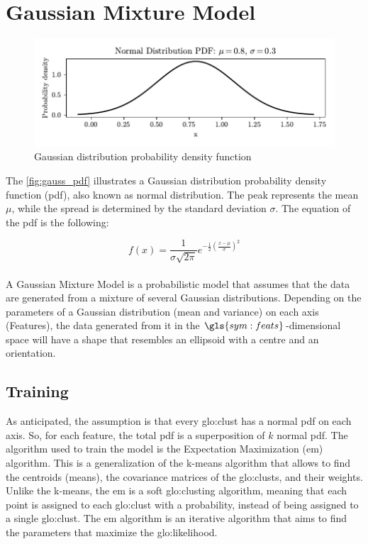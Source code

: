 \section{Gaussian Mixture Model}
\label{sec:gaussian}

\begin{figure}
    \centering
    \includegraphics{images/Gaussian/Figure_3.pdf}
    \caption{Gaussian distribution probability density function}
    \label{fig:gauss_pdf}
\end{figure}

The \autoref{fig:gauss_pdf} illustrates a Gaussian distribution probability density function (\gls{pdf}), also known as normal distribution. The peak represents the mean $\mu$, while the spread is determined by the standard deviation $\sigma$. The equation of the \gls{pdf} is the following:

$$
f(x) = \frac{1}{\sigma \sqrt{2\pi} } e^{-\frac{1}{2}\left(\frac{x-\mu}{\sigma}\right)^2}
$$

\paragraph*{}
A Gaussian Mixture Model is a probabilistic model that assumes that the data are generated from a mixture of several Gaussian distributions. Depending on the parameters of a Gaussian distribution (mean and variance) on each axis (Features), the data generated from it in the $\gls{sym:feats}$-dimensional space will have a shape that resembles an ellipsoid with a centre and an orientation.


\subsection{Training}
\label{sec:gauss_train}
As anticipated, the assumption is that every \gls{glo:clust} has a normal \gls{pdf} on each axis. So, for each feature, the total \gls{pdf} is a superposition of $k$ normal \gls{pdf}. 
The algorithm used to train the model is the Expectation Maximization (\gls{em}) algorithm. This is a generalization of the k-means algorithm that allows to find the centroids (means), the covariance matrices of the \gls{glo:clust}s, and their weights. Unlike the k-means, the \gls{em} is a soft \gls{glo:clust}ing algorithm, meaning that each point is assigned to each \gls{glo:clust} with a probability, instead of being assigned to a single \gls{glo:clust}.
The \gls{em} algorithm is an iterative algorithm that aims to find the parameters that maximize the \gls{glo:likelihood}.


